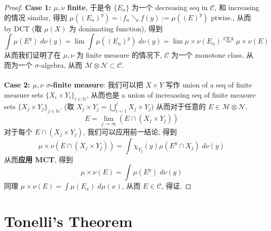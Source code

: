 \documentclass[lang=cn,11pt]{elegantbook}
\begin{document}
\begin{proof}
\textbf{Case 1:  $\mu ,\nu$ finite}, 于是令 $\{E_n\}$ 为一个 decreasing seq in $\mathcal{C}$, 和 increasing 的情况 similar, 得到 \(\mu((E_n)^y)=: f_n  \searrow f(y) := \mu((E)^y) \text{ ptwise.}\), 从而  by DCT (取 $\mu(X)$ 为 donimating function), 得到 \[
\int \mu(E^y) \; d\nu(y) = \lim \int \mu((E_n)^y) \; d\nu(y) = \lim \mu \times \nu(E_n) \overset{\text{CFA}}{=} \mu \times \nu (E)
\] 从而我们证明了在  $\mu,\nu$ 为 finite measure 的情况下, $\mathcal{C}$ 为一个 monotone class, 从而为一个 $\sigma$-algebra, 从而 $\mathcal{M} \otimes \mathcal{N} \subset \mathcal{C}$. \\\\
\textbf{Case 2: $\mu,\nu$ $\sigma$-finite measure}: 我们可以把 $X \times Y$ 写作 union of a seq of finite measure sets $\{ X_i \times Y_i\}_{i\in \mathbb{N}}$, 从而也是 a union of increaasing seq of finite measure sets $\{ X_j \times Y_j\}_{j\in \mathbb{N}}$. (取 $X_j \times Y_j  = \bigcup_{i=1}^j X_j \times Y_j$) 从而对于任意的 $E \in \mathcal{M}\otimes \mathcal{N}$, $$E = \lim_{j\to\infty} (E \cap (X_j\times Y_j))$$
对于每个 $E \cap (X_j\times Y_j)$, 我们可以应用前一结论, 得到 \[
\mu \times \nu (E \cap (X_j\times Y_j)) = \int \chi_{Y_j}(y) \mu(E^y \cap X_j) \; d\nu(y)
\]
从而\textbf{应用 MCT}, 得到 \[
\mu \times \nu (E ) = \int \mu(E^y) \; d\nu(y)
\]
 同理 \(\mu \times \nu (E ) = \int \mu(E_x) \; d\mu(x)\), 从而 $E \in \mathcal{C}$, 得证.
\end{proof}


\section{Tonelli's Theorem}
\end{document}
